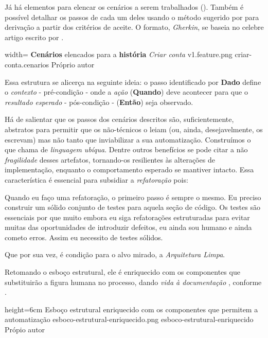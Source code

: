   Já há elementos para elencar os cenários a serem trabalhados (). Também é possível detalhar os passos de cada um deles usando o método sugerido por  para derivação a partir dos critérios de aceite. O formato, \emph{Gherkin}, se baseia no celebre artigo escrito por .

  \imagem
    {width=\textwidth}
    {\textbf{Cenários} elencados para a \textbf{história} \emph{Criar conta}}
    {v1.feature.png}
    {criar-conta.cenarios}
    {Próprio autor}

  Essa estrutura se alicerça na seguinte ideia: o passo identificado por \textbf{Dado} define o \emph{contexto} - pré-condição - onde a \emph{ação} (\textbf{Quando}) deve acontecer para que o \emph{resultado esperado} - pós-condição - (\textbf{Então}) seja observado.

  Há de salientar que os passos dos cenários descritos são, suficientemente, abstratos para permitir que os não-técnicos o leiam (ou, ainda, desejavelmente, os escrevam) mas não tanto que inviabilizar a sua automatização. Construímos o que  chama de \emph{linguagem ubíqua}. Dentre outros benefícios se pode citar a não \emph{fragilidade}\cite[pág. 93, tradução nossa]{RoseWynneHellesoy2015} desses artefatos, tornando-os resilientes às alterações de implementação, enquanto o comportamento esperado se mantiver intacto. Essa característica é essencial para subsidiar a \emph{refatoração} pois:

  \citacaolonga
    {Quando eu faço uma refatoração, o primeiro passo é sempre o mesmo. Eu preciso construir um sólido conjunto de testes para aquela seção de código. Os testes são essenciais por que muito embora eu siga refatorações estruturadas para evitar muitas das oportunidades de introduzir defeitos, eu ainda sou humano e ainda cometo erros. Assim eu necessito de testes sólidos.}
    {\cite[p.  17, tradução nossa]{Fowler1999}}

  Que por sua vez, é condição para o alvo mirado, a \emph{Arquitetura Limpa}.

  Retomando o esboço estrutural, ele é enriquecido com os componentes que substituirão a figura humana no processo, dando \emph{vida à documentação} \cite[pág. 29, tradução nossa]{Adzic2011}, conforme .

  \imagem
    {height=6cm}
    {Esboço estrutural enriquecido com os componentes que permitem a automatização}
    {esboco-estrutural-enriquecido.png}
    {esboco-estrutural-enriquecido}
    {Própio autor}

